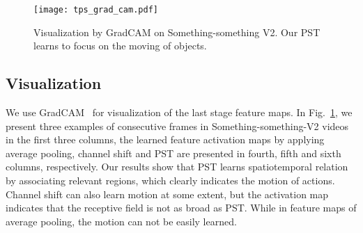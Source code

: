\documentclass[runningheads]{llncs}
\begin{document}
	
	
	
	\begin{table}[h]
		\begin{center}
			\caption{More backbones experiments on Kinetics400.}
			\label{table:backbone}
		\end{center}
		
	\end{table}
	
	\begin{figure}[h]
		
		\begin{center}
			\texttt{[image: tps\_grad\_cam.pdf]}
		\end{center}
		\caption{Visualization by GradCAM on Something-something V2. Our PST learns to focus on the moving of objects. }\label{fig:tps_gradcam}
	\end{figure}
	
	\subsection{Visualization}
	We use GradCAM~\cite{gradcam} for visualization of the last stage feature maps. In Fig.~\ref{fig:tps_gradcam}, we present three examples of consecutive frames in Something-something-V2 videos in the first three columns, the learned feature activation maps by applying average pooling, channel shift and PST are presented in fourth, fifth and sixth columns, respectively. Our results show that PST learns spatiotemporal relation by associating relevant regions, which clearly indicates the motion of actions. Channel shift can also learn motion at some extent, but the activation map indicates that the receptive field is not as broad as PST. While in feature maps of average pooling, the motion can not be easily learned. 
	
\end{document}
